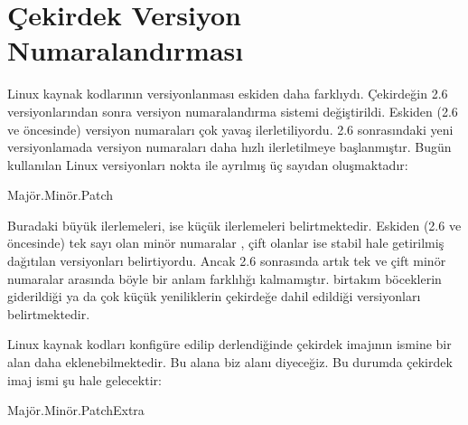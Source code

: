 \documentclass[a4paper,10pt,turkish]{sphinxmanual}
\begin{document}
\section{Çekirdek Versiyon Numaralandırması}
\label{\detokenize{kernelcompilation:cekirdek-versiyon-numaralandirmasi}}
\sphinxAtStartPar
Linux kaynak kodlarının versiyonlanması eskiden daha farklıydı. Çekirdeğin 2.6 versiyonlarından sonra
versiyon numaralandırma sistemi değiştirildi. Eskiden (2.6 ve öncesinde) versiyon numaraları çok yavaş
ilerletiliyordu. 2.6 sonrasındaki yeni versiyonlamada versiyon numaraları daha hızlı ilerletilmeye
başlanmıştır. Bugün kullanılan Linux versiyonları nokta ile ayrılmış üç sayıdan oluşmaktadır:

\begin{sphinxVerbatim}[commandchars=\\\{\}]
Majör.Minör.Patch
\end{sphinxVerbatim}

\sphinxAtStartPar
Buradaki  büyük ilerlemeleri,  ise küçük ilerlemeleri belirtmektedir.
Eskiden (2.6 ve öncesinde) tek sayı olan minör numaralar , çift olanlar ise stabil hale getirilmiş dağıtılan versiyonları belirtiyordu. Ancak
2.6 sonrasında artık tek ve çift minör numaralar arasında böyle bir anlam farklılığı kalmamıştır.
 birtakım böceklerin giderildiği ya da çok küçük yeniliklerin çekirdeğe dahil edildiği
versiyonları belirtmektedir.

\sphinxAtStartPar
Linux kaynak kodları konfigüre edilip derlendiğinde çekirdek imajının ismine bir alan daha
eklenebilmektedir. Bu alana biz  alanı diyeceğiz. Bu durumda çekirdek imaj ismi şu hale
gelecektir:

\begin{sphinxVerbatim}[commandchars=\\\{\}]
Majör.Minör.Patch\PYGZhy{}Extra
\end{sphinxVerbatim}
\end{document}
